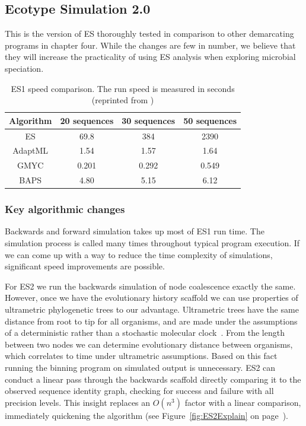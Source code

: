 \subsection*{Ecotype Simulation 2.0}
This is the version of ES thoroughly tested in comparison to other demarcating programs in chapter four.
While the changes are few in number, we believe that they will increase the practicality of using ES analysis when exploring microbial speciation.

\begin{table}
 \begin{tabular}{| c | c | c | c |}
  \hline
  Algorithm & 20 sequences & 30 sequences & 50 sequences \\ \hline
  ES & 69.8 & 384 & 2390 \\
  AdaptML & 1.54 & 1.57 & 1.64 \\
  GMYC & 0.201 & 0.292 & 0.549 \\
  BAPS & 4.80 & 5.15 & 6.12 \\
  \hline
 \end{tabular}
 \caption[ES1 run-time compared to other demarcation programs.]{ES1 speed comparison. The run speed is measured in seconds (reprinted from \protect\cite{carlo})}
 \label{tab:ES1speed}
\end{table}

\subsubsection*{Key algorithmic changes}
Backwards and forward simulation takes up most of ES1 run time.
The simulation process is called many times throughout typical program execution.
If we can come up with a way to reduce the time complexity of simulations, significant speed improvements are possible.

For ES2 we run the backwards simulation of node coalescence exactly the same.
However, once we have the evolutionary history scaffold we can use properties of ultrametric phylogenetic trees to our advantage.
Ultrametric trees have the same distance from root to tip for all organisms, and are made under the assumptions of a deterministic rather than a stochastic molecular clock~\cite{ho2008molecular}.
From the length between two nodes we can determine evolutionary distance between organisms, which correlates to time under ultrametric assumptions.
Based on this fact running the binning program on simulated output is unnecessary.
ES2 can conduct a linear pass through the backwards scaffold directly comparing it to the observed sequence identity graph, checking for success and failure with all precision levels.
This insight replaces an $O(n^3)$ factor with a linear comparison, immediately quickening the algorithm (see Figure~\ref{fig:ES2Explain} on page~\pageref{fig:ES2Explain}).

